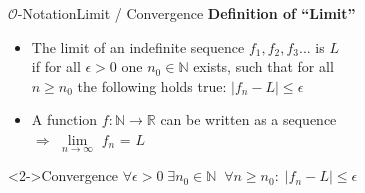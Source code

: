 \begin{frame}{$\mathcal{O}$-Notation}{Limit / Convergence}
\label{slide:limit}
  \textbf{Definition of \enquote{Limit}}
  \begin{itemize}
    \item
      The limit of an indefinite sequence $f_1, f_2, f_3$... is $L$\\
      if for all $\epsilon > 0$ one $n_0 \in \mathbb{N}$ exists, such that for all \\
      $n \geq n_0$ the following holds true: $\left| f_n - L \right| \leq \epsilon$
    \item
      A function $f\!: \mathbb{N} \rightarrow \mathbb{R}$ can be written as a
      sequence\\
      $\Rightarrow$ $\lim\limits_{n \rightarrow \infty}$ $f_n$ = $L$
  \end{itemize}
  \begin{block}<2->{Convergence}
    \begin{math}
      \forall \epsilon > 0 \; \exists n_0 \in \mathbb{N} \;\;
      \forall n \geq n_0 \! : \; \left| f_n - L \right| \leq \epsilon
    \end{math}
  \end{block}
\end{frame}


